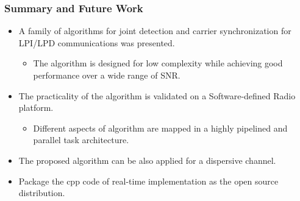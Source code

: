  


  \begin{frame}
    \frametitle{Summary and Future Work}
    \begin{itemize}
      \item A family of algorithms for joint detection and carrier synchronization for LPI/LPD communications was presented.
      \begin{itemize}
        \item The algorithm is designed for low complexity while achieving good performance over a wide range of SNR.
      \end{itemize}
      \item The practicality of the algorithm is validated on a Software-defined Radio platform.
      \begin{itemize}
        \item Different aspects of algorithm are mapped in a highly pipelined and parallel task architecture.
      \end{itemize}

      \item The proposed algorithm can be also applied for a dispersive channel.
      \item Package the cpp code of real-time implementation as the open source distribution.
    \end{itemize}
      
  \end{frame} 